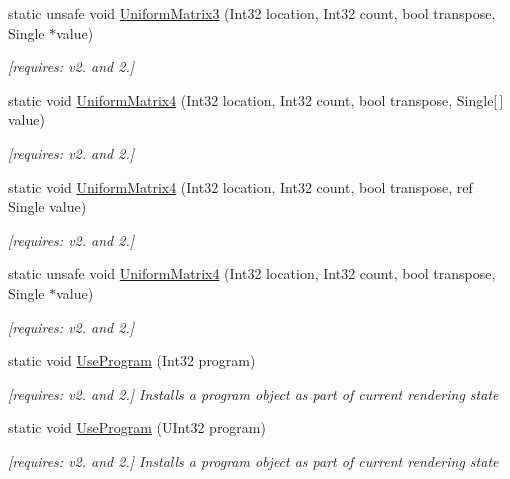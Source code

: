 \begin{DoxyCompactItemize}
static unsafe void \hyperlink{class_open_t_k_1_1_graphics_1_1_e_s20_1_1_g_l_a424c74f4be838520afccf07ce4835c12}{Uniform\-Matrix3} (Int32 location, Int32 count, bool transpose, Single $\ast$value)
\begin{DoxyCompactList}\small\item\em \mbox{[}requires\-: v2. and 2.\mbox{]}\end{DoxyCompactList}\item 
static void \hyperlink{class_open_t_k_1_1_graphics_1_1_e_s20_1_1_g_l_aa9bbd19f7f1cc7a552c4394731f0b879}{Uniform\-Matrix4} (Int32 location, Int32 count, bool transpose, Single\mbox{[}$\,$\mbox{]} value)
\begin{DoxyCompactList}\small\item\em \mbox{[}requires\-: v2. and 2.\mbox{]}\end{DoxyCompactList}\item 
static void \hyperlink{class_open_t_k_1_1_graphics_1_1_e_s20_1_1_g_l_ab05185d5841620a111c804ceead2a1e8}{Uniform\-Matrix4} (Int32 location, Int32 count, bool transpose, ref Single value)
\begin{DoxyCompactList}\small\item\em \mbox{[}requires\-: v2. and 2.\mbox{]}\end{DoxyCompactList}\item 
static unsafe void \hyperlink{class_open_t_k_1_1_graphics_1_1_e_s20_1_1_g_l_ad662718afcc8eadec61a73c7ebc3f425}{Uniform\-Matrix4} (Int32 location, Int32 count, bool transpose, Single $\ast$value)
\begin{DoxyCompactList}\small\item\em \mbox{[}requires\-: v2. and 2.\mbox{]}\end{DoxyCompactList}\item 
static void \hyperlink{class_open_t_k_1_1_graphics_1_1_e_s20_1_1_g_l_ab0c51bd9580fb9ddd2051026825bd459}{Use\-Program} (Int32 program)
\begin{DoxyCompactList}\small\item\em \mbox{[}requires\-: v2. and 2.\mbox{]} Installs a program object as part of current rendering state \end{DoxyCompactList}\item 
static void \hyperlink{class_open_t_k_1_1_graphics_1_1_e_s20_1_1_g_l_af7d83ef583bf1995de7fac43a1b467bf}{Use\-Program} (U\-Int32 program)
\begin{DoxyCompactList}\small\item\em \mbox{[}requires\-: v2. and 2.\mbox{]} Installs a program object as part of current rendering state \end{DoxyCompactList}\item 

\end{DoxyCompactItemize}
